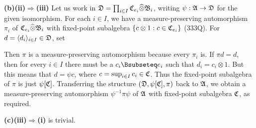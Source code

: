 {\medskip

{\bf (b)(ii)$\Rightarrow$(iii)} Let us work in
$\frak D=\prod_{i\in I}\frak C_{e_i}\widehat{\otimes}\frak B_i$, writing
$\psi:\frak A\to\frak D$ for the given isomorphism.
For each $i\in I$, we have a measure-preserving automorphism $\pi_i$ of
$\frak C_{e_i}\widehat{\otimes}\frak B_i$ with fixed-point subalgebra
$\{c\otimes 1:c\in\frak C_{e_i}\}$ (333Q).   For
$d=\langle d_i\rangle_{i\in I}\in\frak D$, set


\noindent Then $\pi$ is a measure-preserving automorphism because every
$\pi_i$ is.   If $\pi d=d$, then for every $i\in I$ there must be a
$c_i\Bsubseteq e_i$ such that $d_i=c_i\otimes 1$.   But this means that
$d=\psi c$, where $c=\sup_{i\in I}c_i\in\frak C$.   Thus the fixed-point
subalgebra of $\pi$ is just $\psi[\frak C]$.   Transferring the
structure $(\frak D,\psi[\frak C],\pi)$ back to $\frak A$, we obtain a
measure-preserving automorphism $\psi^{-1}\pi\psi$ of $\frak A$ with
fixed-point subalgebra $\frak C$, as required.

\medskip

{\bf (c)(iii)$\Rightarrow$(i)} is trivial.
}%

